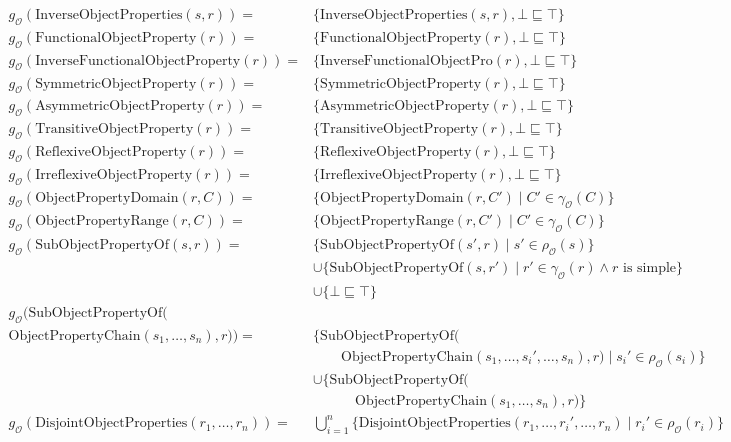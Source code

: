 \begin{align*}
    g_\mathcal{O}(\mathrm{InverseObjectProperties}(s, r)) =& \{ \mathrm{InverseObjectProperties}(s, r), \bot \sqsubseteq \top \} \\
    g_\mathcal{O}(\mathrm{FunctionalObjectProperty}(r)) =& \{ \mathrm{FunctionalObjectProperty}(r), \bot \sqsubseteq \top \} \\
    g_\mathcal{O}(\mathrm{InverseFunctionalObjectProperty}(r)) =& \{ \mathrm{InverseFunctionalObjectPro}(r), \bot \sqsubseteq \top \} \\
    g_\mathcal{O}(\mathrm{SymmetricObjectProperty}(r)) =& \{ \mathrm{SymmetricObjectProperty}(r), \bot \sqsubseteq \top \} \\
    g_\mathcal{O}(\mathrm{AsymmetricObjectProperty}(r)) =& \{ \mathrm{AsymmetricObjectProperty}(r), \bot \sqsubseteq \top \} \\
    g_\mathcal{O}(\mathrm{TransitiveObjectProperty}(r)) =& \{ \mathrm{TransitiveObjectProperty}(r), \bot \sqsubseteq \top \} \\
    g_\mathcal{O}(\mathrm{ReflexiveObjectProperty}(r)) =& \{ \mathrm{ReflexiveObjectProperty}(r), \bot \sqsubseteq \top \} \\
    g_\mathcal{O}(\mathrm{IrreflexiveObjectProperty}(r)) =& \{ \mathrm{IrreflexiveObjectProperty}(r), \bot \sqsubseteq \top \} \\
    g_\mathcal{O}(\mathrm{ObjectPropertyDomain}(r, C)) =& \{\mathrm{ObjectPropertyDomain}(r, C') \mid C' \in \gamma_\mathcal{O}  (C)\} \\
    g_\mathcal{O}(\mathrm{ObjectPropertyRange}(r, C)) =& \{\mathrm{ObjectPropertyRange}(r, C') \mid C' \in \gamma_\mathcal{O}  (C)\} \\
    g_\mathcal{O}(\mathrm{SubObjectPropertyOf}(s, r)) =& \{\mathrm{SubObjectPropertyOf}(s', r) \mid s' \in \rho_\mathcal{O} (s)\} \\& \cup \{\mathrm{SubObjectPropertyOf}(s, r') \mid r' \in \gamma_\mathcal{O}  (r) \land r \text{ is simple}\} \\& \cup \{ \bot \sqsubseteq \top \} \\
    g_\mathcal{O}(\mathrm{SubObjectPropertyOf}(\qquad \qquad \qquad \qquad &\\\mathrm{ObjectPropertyChain}(s_1, \dots, s_n), r)) =& \{\mathrm{SubObjectPropertyOf}( \\& \qquad \mathrm{ObjectPropertyChain}(s_1, \dots, s_i', \dots, s_n), r) \mid s_i' \in \rho_\mathcal{O} (s_i)\} \\& \cup \{\mathrm{SubObjectPropertyOf}( \\& \quad \qquad \mathrm{ObjectPropertyChain}(s_1, \dots, s_n), r)\} \\
    g_\mathcal{O}(\mathrm{DisjointObjectProperties}(r_1, \dots, r_n)) =& \bigcup_{i=1}^n \{ \mathrm{DisjointObjectProperties}(r_1, \dots, r_i', \dots, r_n) \mid r_i' \in \rho_\mathcal{O}(r_i) \}
\end{align*}
\endgroup
